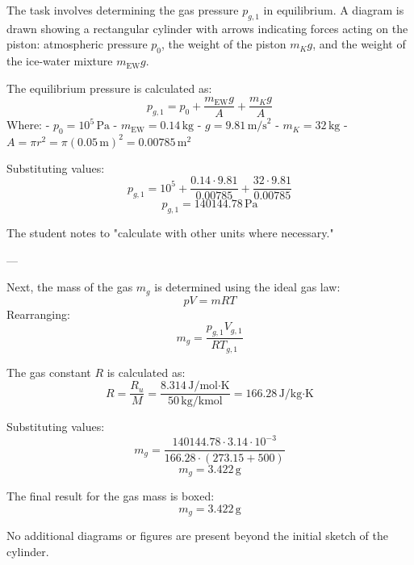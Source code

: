 The task involves determining the gas pressure \( p_{g,1} \) in equilibrium. A diagram is drawn showing a rectangular cylinder with arrows indicating forces acting on the piston: atmospheric pressure \( p_0 \), the weight of the piston \( m_K g \), and the weight of the ice-water mixture \( m_{\text{EW}} g \).  

The equilibrium pressure is calculated as:  
\[
p_{g,1} = p_0 + \frac{m_{\text{EW}} g}{A} + \frac{m_K g}{A}
\]  
Where:  
- \( p_0 = 10^5 \, \text{Pa} \)  
- \( m_{\text{EW}} = 0.14 \, \text{kg} \)  
- \( g = 9.81 \, \text{m/s}^2 \)  
- \( m_K = 32 \, \text{kg} \)  
- \( A = \pi r^2 = \pi (0.05 \, \text{m})^2 = 0.00785 \, \text{m}^2 \)  

Substituting values:  
\[
p_{g,1} = 10^5 + \frac{0.14 \cdot 9.81}{0.00785} + \frac{32 \cdot 9.81}{0.00785}
\]  
\[
p_{g,1} = 140144.78 \, \text{Pa}
\]  

The student notes to "calculate with other units where necessary."  

---

Next, the mass of the gas \( m_g \) is determined using the ideal gas law:  
\[
p V = m R T
\]  
Rearranging:  
\[
m_g = \frac{p_{g,1} V_{g,1}}{R T_{g,1}}
\]  

The gas constant \( R \) is calculated as:  
\[
R = \frac{R_u}{M} = \frac{8.314 \, \text{J/mol·K}}{50 \, \text{kg/kmol}} = 166.28 \, \text{J/kg·K}
\]  

Substituting values:  
\[
m_g = \frac{140144.78 \cdot 3.14 \cdot 10^{-3}}{166.28 \cdot (273.15 + 500)}
\]  
\[
m_g = 3.422 \, \text{g}
\]  

The final result for the gas mass is boxed:  
\[
m_g = 3.422 \, \text{g}
\]  

No additional diagrams or figures are present beyond the initial sketch of the cylinder.